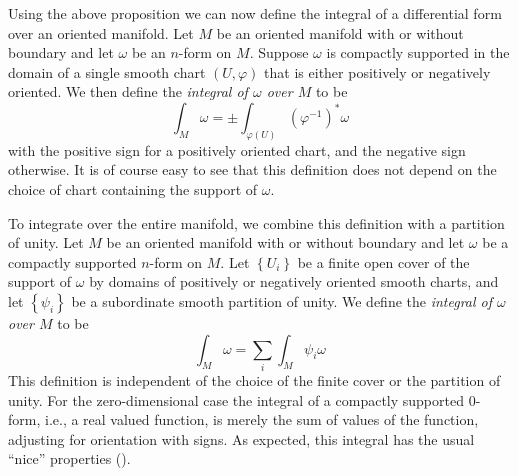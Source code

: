 \documentclass[a4paper, 12pt]{article}
\begin{document}
Using the above proposition we can now define the integral of a differential form over an oriented manifold.
Let $M$ be an oriented manifold with or without boundary and let $\omega$ be an $n$-form on $M$.
Suppose $\omega$ is compactly supported in the domain of a single smooth chart $(U,\varphi)$ that is either positively or negatively oriented.
We then define the \emph{integral of $\omega$ over $M$} to be
\[
    \int_{M} \omega = \pm \int_{\varphi(U)} \left( \varphi^{-1} \right)^*\omega
\]
with the positive sign for a positively oriented chart, and the negative sign otherwise.
It is of course easy to see that this definition does not depend on the choice of chart containing the support of $\omega$.

To integrate over the entire manifold, we combine this definition with a partition of unity.
Let $M$ be an oriented manifold with or without boundary and let $\omega$ be a compactly supported $n$-form on $M$.
Let $\left\{ U_i \right\}$ be a finite open cover of the support of $\omega$ by domains of positively or negatively oriented smooth charts,
and let $\left\{ \psi_i \right\}$ be a subordinate smooth partition of unity.
We define the \emph{integral of $\omega$ over $M$} to be
\[
    \int_{M} \omega = \sum_{i} \int_{M} \psi_i\omega
\]
This definition is independent of the choice of the finite cover or the partition of unity.
For the zero-dimensional case the integral of a compactly supported $0$-form, i.e., a real valued function,
is merely the sum of values of the function, adjusting for orientation with signs.
As expected, this integral has the usual ``nice'' properties (\cite[Prop. 16.6]{Lee2012}).
\end{document}
